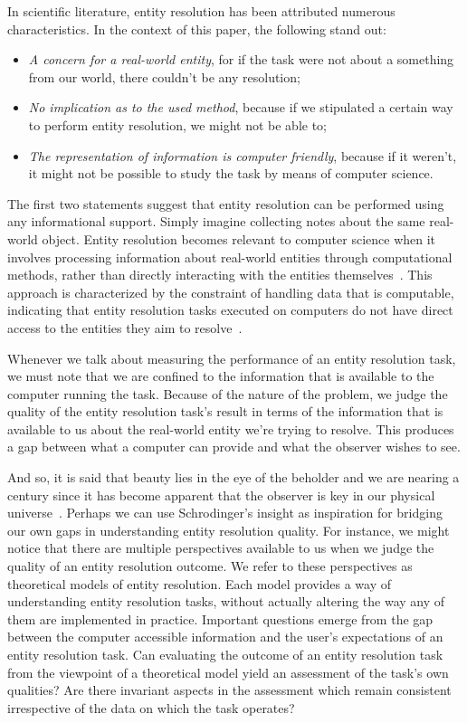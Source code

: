 In scientific literature, entity resolution has been attributed numerous
characteristics\cite{Tal11,Pap19}.
In the context of this paper, the following stand out:

\begin{itemize}
    \item\textit{A concern for a real-world entity}, for if the task were
    not about a something from our world, there couldn't be any resolution;
    \item\textit{No implication as to the used method}, because if we
    stipulated a certain way to perform entity resolution, we might not be
    able to;
    \item\textit{The representation of information is computer friendly},
    because if it weren't, it might not be possible to study the task by
    means of computer science.
\end{itemize}

The first two statements suggest that entity resolution can be performed
using any informational support.
Simply imagine collecting notes about the same real-world object.
Entity resolution becomes relevant to computer science when it involves
processing information about real-world entities through computational
methods, rather than directly interacting with the entities
themselves~\cite{Tal11}.
This approach is characterized by the constraint of handling data that is
computable, indicating that entity resolution tasks executed on computers
do not have direct access to the entities they aim to resolve~\cite{Chen09}.

Whenever we talk about measuring the performance of an entity resolution
task, we must note that we are confined to the information that is available
to the computer running the task.
Because of the nature of the problem, we judge the quality of the entity
resolution task's result in terms of the information that is available to us
about the real-world entity we're trying to resolve.
This produces a gap between what a computer can provide and what the
observer wishes to see.

And so, it is said that beauty lies in the eye of the beholder and we are
nearing a century since it has become apparent that the observer is key in
our physical universe~\cite{schrodinger1926}.
Perhaps we can use Schrodinger's insight as inspiration for bridging our own
gaps in understanding entity resolution quality.
For instance, we might notice that there are multiple perspectives available
to us when we judge the quality of an entity resolution outcome.
We refer to these perspectives as theoretical models of entity resolution.
Each model provides a way of understanding entity resolution tasks, without
actually altering the way any of them are implemented in practice.
Important questions emerge from the gap between the computer accessible
information and the user's expectations of an entity resolution task.
Can evaluating the outcome of an entity resolution task from the viewpoint of a
theoretical model yield an assessment of the task's own qualities?
Are there invariant aspects in the assessment which remain consistent
irrespective of the data on which the task operates?

